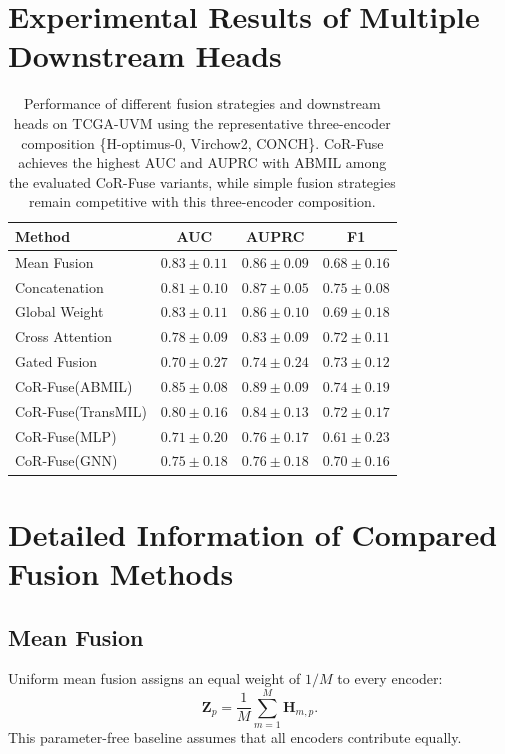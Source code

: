 \section{Experimental Results of Multiple Downstream Heads}
\begin{table}[!ht]
\centering
\caption{Performance of different fusion strategies and downstream heads on TCGA-UVM using the representative three-encoder composition \{H-optimus-0, Virchow2, CONCH\}.
CoR-Fuse achieves the highest AUC and AUPRC with ABMIL among the evaluated CoR-Fuse variants, while simple fusion strategies remain competitive with this three-encoder composition.}
\label{tab:downstream_heads}
\begin{tabular}{lccc}
\toprule
Method & AUC & AUPRC & F1 \\
\midrule
Mean Fusion & $0.83 \pm 0.11$ & $0.86 \pm 0.09$ & $0.68 \pm 0.16$ \\
Concatenation & $0.81 \pm 0.10$ & $0.87 \pm 0.05$ & $\mathbf{0.75 \pm 0.08}$ \\
Global Weight & $0.83 \pm 0.11$ & $0.86 \pm 0.10$ & $0.69 \pm 0.18$ \\
Cross Attention & $0.78 \pm 0.09$ & $0.83 \pm 0.09$ & $0.72 \pm 0.11$ \\
Gated Fusion & $0.70 \pm 0.27$ & $0.74 \pm 0.24$ & $0.73 \pm 0.12$ \\
CoR-Fuse(ABMIL) & $\mathbf{0.85 \pm 0.08}$ & $\mathbf{0.89 \pm 0.09}$ & $0.74 \pm 0.19$ \\
CoR-Fuse(TransMIL) & $0.80 \pm 0.16$ & $0.84 \pm 0.13$ & $0.72 \pm 0.17$ \\
CoR-Fuse(MLP) & $0.71 \pm 0.20$ & $0.76 \pm 0.17$ & $0.61 \pm 0.23$ \\
CoR-Fuse(GNN) & $0.75 \pm 0.18$ & $0.76 \pm 0.18$ & $0.70 \pm 0.16$ \\
\bottomrule
\end{tabular}
\end{table}

\section{Detailed Information of Compared Fusion Methods}
\label{sec:contrast_method}

\subsection{Mean Fusion}
Uniform mean fusion assigns an equal weight of $1/M$ to every encoder:
\begin{equation}
\mathbf{Z}_p =
\frac{1}{M}\sum_{m=1}^{M}\mathbf{H}_{m,p}.
\end{equation}
This parameter-free baseline assumes that all encoders contribute equally.

